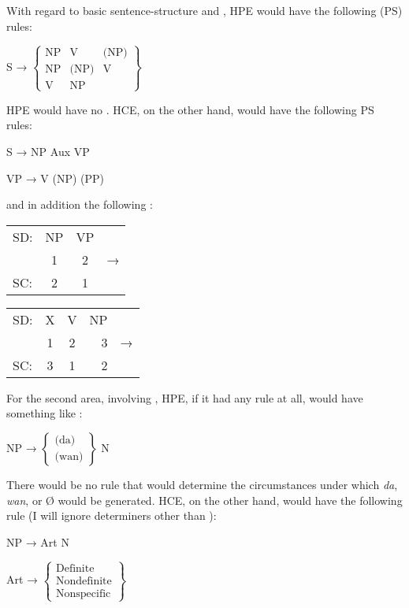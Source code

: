 With regard to basic sentence-structure and , HPE would have the following  (PS) rules: 

\ea\label{ex:86}
S → $\left\{\begin{array}{lcr} \text{NP} & \text{V} & \text{(NP)}\\\text{NP} & \text{(NP)} & \text{V}\\\text{V} & \text{NP} & \end{array}\right\} $ 
\z


\noindent HPE would have no . HCE, on the other hand, would have the following PS rules:

\ea\label{ex:87}
S → NP Aux VP
\z

\ea\label{ex:88}
VP → V (NP) (PP)
\z

\noindent and in addition the following :

\ea\label{ex:89}
\begin{tabular}[t]{lccr}
SD: & NP & VP & \\
& 1 & 2 & → \\
SC: & 2 & 1 & \\
\end{tabular}
\z
\ea\label{ex:90}
\begin{tabular}[t]{lccrr}
	SD: & X & V & NP & \\
	& 1 & 2 & 3 &  → \\
	SC: & 3 & 1 & 2 & \\
\end{tabular}
\z

For the second area, involving , HPE, if it had any rule at all, would have something like : 

\ea\label{ex:91}
NP → $\left\{\begin{array}{l} \text{(da)}\\ \text{(wan)} \end{array}\right\} $ N
\z

\noindent There would be no rule that would determine the circumstances under which \textit{da}, \textit{wan}, or {\O} would be generated. HCE, on the other hand, would have the following rule (I will ignore determiners other than ): 

\ea\label{ex:92}
NP → Art N
\z

\ea\label{ex:93}
Art → $\left\{\begin{array}{l} \text{Definite} \\ \text{Nondefinite} \\ \text{Nonspecific}\end{array}\right\}$
\z

